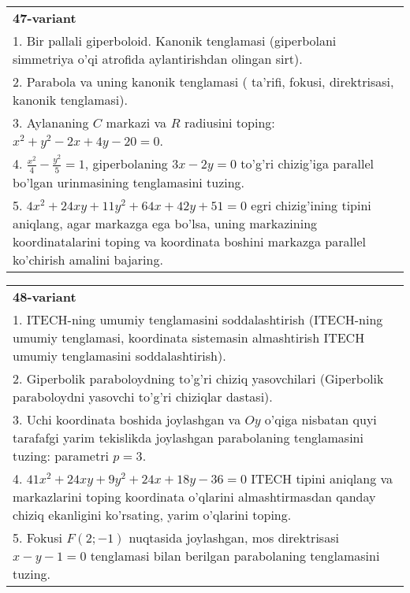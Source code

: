 \documentclass{article}
\begin{document}
\begin{tabular}{m{17cm}}
\textbf{47-variant}\\
1. Bir pallali giperboloid. Kanonik tenglamasi (giperbolani simmetriya o'qi atrofida aylantirishdan olingan sirt).\\

2. Parabola va uning kanonik tenglamasi ( ta'rifi, fokusi, direktrisasi, kanonik tenglamasi).\\

3. Aylananing $C$ markazi va $R$ radiusini toping: $x^2+y^2-2x+4y-20=0$.\\

4. $\frac{x^{2}}{4} - \frac{y^{2}}{5} = 1$, giperbolaning $3x - 2y = 0$ to'g'ri chizig'iga parallel bo'lgan urinmasining tenglamasini tuzing.  \\

5. $4x^{2} + 24xy + 11y^{2} + 64x + 42y + 51 = 0$ egri chizig'ining tipini aniqlang, agar markazga ega bo'lsa, uning markazining koordinatalarini toping va koordinata boshini markazga parallel ko'chirish amalini bajaring.
\end{tabular}
\vspace{1cm}


\begin{tabular}{m{17cm}}
\textbf{48-variant}\\
1. ITECH-ning umumiy tenglamasini soddalashtirish (ITECH-ning umumiy tenglamasi, koordinata sistemasin almashtirish ITECH umumiy tenglamasini soddalashtirish).\\

2. Giperbolik paraboloydning to'g'ri chiziq yasovchilari (Giperbolik paraboloydni yasovchi to'g'ri chiziqlar dastasi).\\

3. Uchi koordinata boshida joylashgan va $Oy$ o'qiga nisbatan quyi tarafafgi yarim tekislikda joylashgan parabolaning tenglamasini tuzing: parametri $p=3$.\\

4. $41x^{2} + 24xy + 9y^{2} + 24x + 18y - 36 = 0$ ITECH tipini aniqlang va markazlarini toping koordinata o'qlarini almashtirmasdan qanday chiziq ekanligini ko'rsating, yarim o'qlarini toping.  \\

5. Fokusi $F(2; - 1)$ nuqtasida joylashgan, mos direktrisasi $x - y - 1 = 0$ tenglamasi bilan berilgan parabolaning tenglamasini tuzing.  
\end{tabular}
\vspace{1cm}
\end{document}
